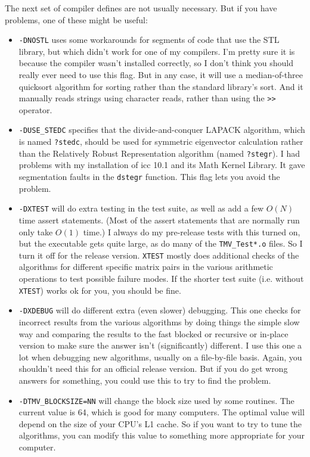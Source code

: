 \documentclass[twoside,letterpaper,11pt]{article}
\renewcommand{\tt}[1]{{\texttt {#1}}}
\begin{document}
The next set of compiler defines are not usually necessary.  But
if you have problems, one of these might be useful:
\begin{itemize}
\item
\tt{-DNOSTL} uses some workarounds for segments of code that use the STL
library, but which didn't work for one of my compilers.  I'm pretty sure it is
because the compiler wasn't installed correctly, so I don't think you
should really ever need to use this flag.  
But in any case, it 
will use a median-of-three quicksort algorithm for sorting
rather than the standard library's sort.  And it manually reads strings 
using character reads, rather than using the \tt{>>} operator.  
\item
\tt{-DUSE\_STEDC} specifies that the divide-and-conquer LAPACK algorithm,
which is named \tt{?stedc}, should
be used for symmetric eigenvector calculation rather than the 
Relatively Robust Representation algorithm (named \tt{?stegr}).  I had problems with my
installation of icc 10.1 and its Math Kernel Library.  It gave segmentation
faults in the \tt{dstegr} function.  This flag lets you avoid the problem.
\item
\tt{-DXTEST} will do extra testing in the test suite, as well as add a few $O(N)$
time assert statements.  (Most of the assert statements that are normally run only take
$O(1)$ time.)  I always do my pre-release tests with this turned on, but the
executable gets quite large, as do many of the \tt{TMV\_Test*.o} files.  So I 
turn it off for the release version.  \tt{XTEST} mostly does additional checks
of the algorithms for different specific matrix pairs in the various
arithmetic operations to test possible failure modes.  If the shorter test suite
(i.e. without \tt{XTEST}) works ok for you, you should be fine.
\item
\tt{-DXDEBUG} will do different extra (even slower) debugging.  This one checks for
incorrect results from the various algorithms by doing things the simple slow way
and comparing the results to the fast blocked or recursive or in-place version
to make sure the answer isn't (significantly) different.  
I use this one a lot when debugging
new algorithms, usually on a file-by-file basis.  Again, you shouldn't need this for
an official release version.  But if you do get wrong answers for something, you could
use this to try to find the problem.
\item
\tt{-DTMV\_BLOCKSIZE=NN} will change the block size used by some routines.  
The current value is 64, which is good for many computers.  
The optimal value will depend on the size of your
CPU's L1 cache.  So if you want to try to tune the algorithms, you can 
modify this value to something more appropriate for your computer.
\end{itemize}
\end{document}
